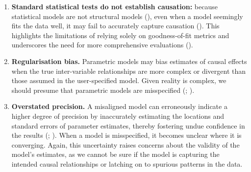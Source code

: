 \documentclass[
  singlecolumn,
  9pt]{article}
\begin{document}
\begin{enumerate}
\def\labelenumi{\alph{enumi}.}
\item
  \textbf{Standard statistical tests do not establish causation:}
  because statistical models are not structural models
  (), even when a
  model seemingly fits the data well, it may fail to accurately capture
  causation (). This
  highlights the limitations of relying solely on goodness-of-fit
  metrics and underscores the need for more comprehensive evaluations
  ().
\item
  \textbf{Regularisation bias.} Parametric models may bias estimates of
  causal effects when the true inter-variable relationships are more
  complex or divergent than those assumed in the user-specified model.
  Given reality is complex, we should presume that parametric models are
  misspecified (; ).
\item
  \textbf{Overstated precision.} A misaligned model can erroneously
  indicate a higher degree of precision by inaccurately estimating the
  locations and standard errors of parameter estimates, thereby
  fostering undue confidence in the results
  (;
  ). When a
  model is misspecified, it becomes unclear where it is converging.
  Again, this uncertainty raises concerns about the validity of the
  model's estimates, as we cannot be sure if the model is capturing the
  intended causal relationships or latching on to spurious patterns in
  the data.
\end{enumerate}
\end{document}
